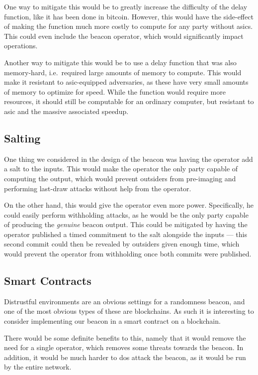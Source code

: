 One way to mitigate this would be to greatly increase the difficulty of the delay function, like it has been done in bitcoin. However, this would have the side-effect of making the function much more costly to compute for any party without \glspl{asic}. This could even include the beacon operator, which would significantly impact operations.

Another way to mitigate this would be to use a delay function that was also memory-hard, i.e.\ required large amounts of memory to compute. This would make it resistant to \gls{asic}-equipped adversaries, as these have very small amounts of memory to optimize for speed. While the function would require more resources, it should still be computable for an ordinary computer, but resistant to \gls{asic} and the massive associated speedup.

\subsection{Salting}

One thing we considered in the design of the beacon was having the operator add a salt to the inputs.
This would make the operator the only party capable of computing the output, which would prevent outsiders from pre-imaging and performing last-draw attacks without help from the operator.

On the other hand, this would give the operator even more power. Specifically, he could easily perform withholding attacks, as he would be the only party capable of producing the \textit{genuine} beacon output. This could be mitigated by having the operator published a timed commitment to the salt alongside the inputs --- this second commit could then be revealed by outsiders given enough time, which would prevent the operator from withholding once both commits were published.

\subsection{Smart Contracts}
Distrustful environments are an obvious settings for a randomness beacon, and one of the most obvious types of these are blockchains. As such it is interesting to consider implementing our beacon in a smart contract on a blockchain.

There would be some definite benefits to this, namely that it would remove the need for a single operator, which removes some threats towards the beacon. In addition, it would be much harder to \acrshort{dos} attack the beacon, as it would be run by the entire network.

